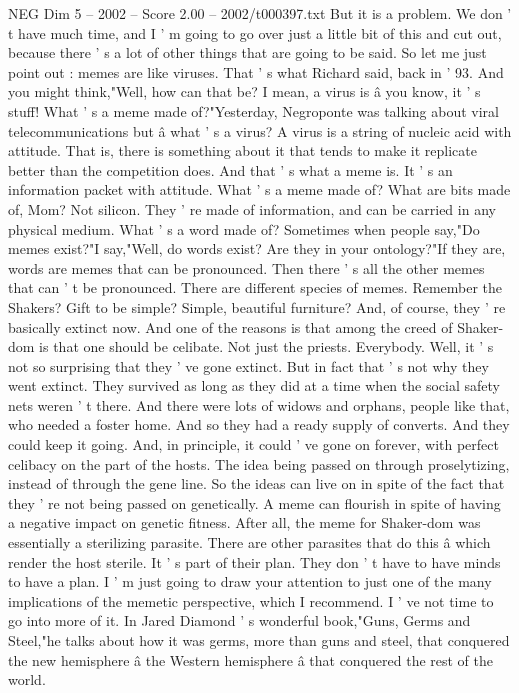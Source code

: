 \begin{textsample}{NEG Dim 5 – 2002 – Score 2.00 – 2002/t000397.txt}
But it is a problem.
We don ' t have much time, and I ' m going to go over just a little bit of this and cut out, because there ' s a lot of other things that are going to be said.
So let me just point out : memes are like viruses.
That ' s what Richard said, back in ' 93.
And you might think,"Well, how can that be?
I mean, a virus is â you know, it ' s stuff!
What ' s a meme made of?"Yesterday, Negroponte was talking about viral telecommunications but â what ' s a virus?
A virus is a string of nucleic acid with attitude.
That is, there is something about it that tends to make it replicate better than the competition does.
And that ' s what a meme is.
It ' s an information packet with attitude.
What ' s a meme made of?
What are bits made of, Mom?
Not silicon.
They ' re made of information, and can be carried in any physical medium.
What ' s a word made of?
Sometimes when people say,"Do memes exist?"I say,"Well, do words exist?
Are they in your ontology?"If they are, words are memes that can be pronounced.
Then there ' s all the other memes that can ' t be pronounced.
There are different species of memes.
Remember the Shakers?
Gift to be simple?
Simple, beautiful furniture?
And, of course, they ' re basically extinct now.
And one of the reasons is that among the creed of Shaker-dom is that one should be celibate.
Not just the priests.
Everybody.
Well, it ' s not so surprising that they ' ve gone extinct.
But in fact that ' s not why they went extinct.
They survived as long as they did at a time when the social safety nets weren ' t there.
And there were lots of widows and orphans, people like that, who needed a foster home.
And so they had a ready supply of converts.
And they could keep it going.
And, in principle, it could ' ve gone on forever, with perfect celibacy on the part of the hosts.
The idea being passed on through proselytizing, instead of through the gene line.
So the ideas can live on in spite of the fact that they ' re not being passed on genetically.
A meme can flourish in spite of having a negative impact on genetic fitness.
After all, the meme for Shaker-dom was essentially a sterilizing parasite.
There are other parasites that do this â which render the host sterile.
It ' s part of their plan.
They don ' t have to have minds to have a plan.
I ' m just going to draw your attention to just one of the many implications of the memetic perspective, which I recommend.
I ' ve not time to go into more of it.
In Jared Diamond ' s wonderful book,"Guns, Germs and Steel,"he talks about how it was germs, more than guns and steel, that conquered the new hemisphere â the Western hemisphere â that conquered the rest of the world.

\end{textsample}
